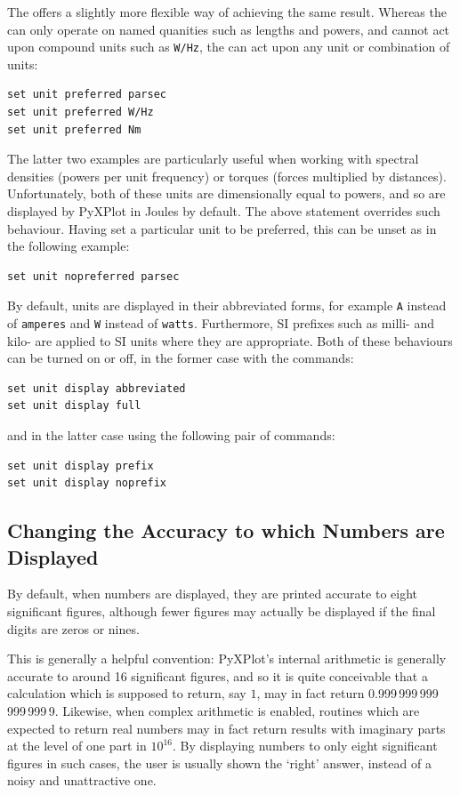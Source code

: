 The  offers a slightly more flexible way of
achieving the same result. Whereas the  can only operate
on named quanities such as lengths and powers, and cannot act upon compound
units such as {\tt W/Hz}, the  can act upon any
unit or combination of units:
\begin{verbatim}
set unit preferred parsec
set unit preferred W/Hz
set unit preferred Nm
\end{verbatim}
The latter two examples are particularly useful when working with spectral
densities (powers per unit frequency) or torques (forces multiplied by
distances). Unfortunately, both of these units are dimensionally equal to
powers, and so are displayed by PyXPlot in Joules by default. The above
statement overrides such behaviour. Having set a particular unit to be
preferred, this can be unset as in the following example:
\begin{verbatim}
set unit nopreferred parsec
\end{verbatim}

By default, units are displayed in their abbreviated forms, for example {\tt A}
instead of {\tt amperes} and {\tt W} instead of {\tt watts}. Furthermore, SI
prefixes such as milli- and kilo- are applied to SI units where they are
appropriate. Both of these
behaviours can be turned on or off, in the former case with the commands:

\begin{verbatim}
set unit display abbreviated
set unit display full
\end{verbatim}

\noindent and in the latter case using the following pair of commands:

\begin{verbatim}
set unit display prefix
set unit display noprefix
\end{verbatim}

\subsection{Changing the Accuracy to which Numbers are Displayed}

By default, when numbers are displayed, they are printed accurate to eight
significant figures, although fewer figures may actually be displayed if the
final digits are zeros or nines.

This is generally a helpful convention: PyXPlot's internal arithmetic is
generally accurate to around 16 significant figures, and so it is quite
conceivable that a calculation which is supposed to return, say $1$, may in
fact return 0.999\,999\,999\,999\,999\,9. Likewise, when complex arithmetic is
enabled, routines which are expected to return real numbers may in fact return
results with imaginary parts at the level of one part in $10^{16}$.  By
displaying numbers to only eight significant figures in such cases, the user is
usually shown the `right' answer, instead of a noisy and unattractive one.

